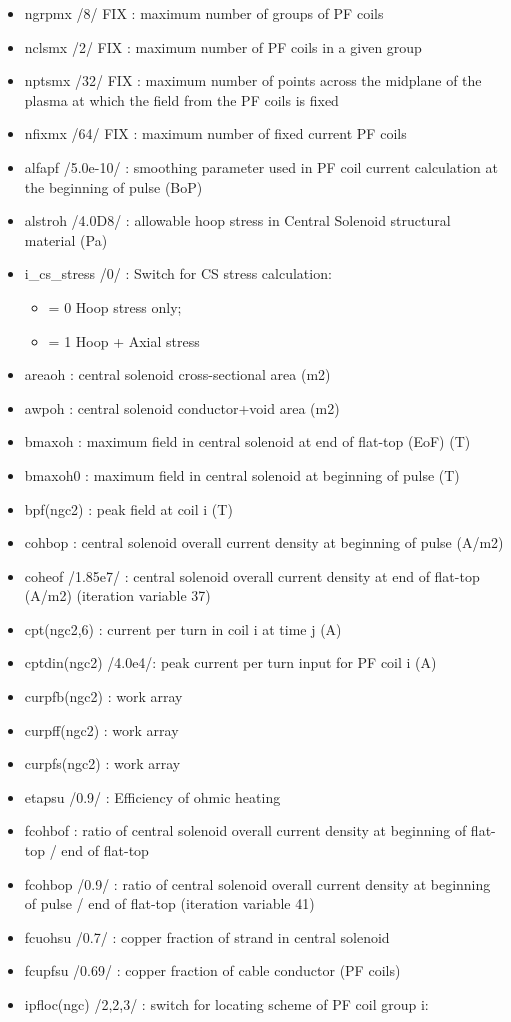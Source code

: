 \documentclass[]{article}
\begin{document}
\begin{itemize}
\itemsep1pt\parskip0pt
\item
  ngrpmx /8/ FIX : maximum number of groups of PF coils
\item
  nclsmx /2/ FIX : maximum number of PF coils in a given group
\item
  nptsmx /32/ FIX : maximum number of points across the midplane of the
  plasma at which the field from the PF coils is fixed
\item
  nfixmx /64/ FIX : maximum number of fixed current PF coils
\item
  alfapf /5.0e-10/ : smoothing parameter used in PF coil current
  calculation at the beginning of pulse (BoP)
\item
  alstroh /4.0D8/ : allowable hoop stress in Central Solenoid structural
  material (Pa)
\item
  i\_cs\_stress /0/ : Switch for CS stress calculation:

  \begin{itemize}
  \itemsep1pt\parskip0pt
  \item
    = 0 Hoop stress only;
  \item
    = 1 Hoop + Axial stress
  \end{itemize}
\item
  areaoh : central solenoid cross-sectional area (m2)
\item
  awpoh : central solenoid conductor+void area (m2)
\item
  bmaxoh : maximum field in central solenoid at end of flat-top (EoF)
  (T)
\item
  bmaxoh0 : maximum field in central solenoid at beginning of pulse (T)
\item
  bpf(ngc2) : peak field at coil i (T)
\item
  cohbop : central solenoid overall current density at beginning of
  pulse (A/m2)
\item
  coheof /1.85e7/ : central solenoid overall current density at end of
  flat-top (A/m2) (iteration variable 37)
\item
  cpt(ngc2,6) : current per turn in coil i at time j (A)
\item
  cptdin(ngc2) /4.0e4/: peak current per turn input for PF coil i (A)
\item
  curpfb(ngc2) : work array
\item
  curpff(ngc2) : work array
\item
  curpfs(ngc2) : work array
\item
  etapsu /0.9/ : Efficiency of ohmic heating
\item
  fcohbof : ratio of central solenoid overall current density at
  beginning of flat-top / end of flat-top
\item
  fcohbop /0.9/ : ratio of central solenoid overall current density at
  beginning of pulse / end of flat-top (iteration variable 41)
\item
  fcuohsu /0.7/ : copper fraction of strand in central solenoid
\item
  fcupfsu /0.69/ : copper fraction of cable conductor (PF coils)
\item
  ipfloc(ngc) /2,2,3/ : switch for locating scheme of PF coil group i:


\end{itemize}
\end{document}
